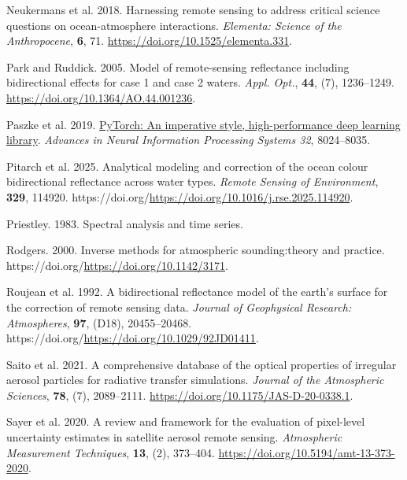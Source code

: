 \documentclass[
  11pt,
  letterpaper,
]{scrreprt}
\newlength{\cslhangindent}
\newenvironment{CSLReferences}[2] %
 {\begin{list}{}{%
  \setlength{\itemindent}{0pt}
  \setlength{\leftmargin}{0pt}
  \setlength{\parsep}{0pt}
  \ifodd #1
   \setlength{\leftmargin}{\cslhangindent}
   \setlength{\itemindent}{-1\cslhangindent}
  \fi
  \setlength{\itemsep}{#2\baselineskip}}}
 {\end{list}}
\begin{document}
\begin{CSLReferences}{1}{1}
Neukermans et al. 2018. Harnessing remote sensing to address critical
science questions on ocean-atmosphere interactions. \emph{Elementa:
Science of the Anthropocene}, \textbf{6}, 71.
\url{https://doi.org/10.1525/elementa.331}.

Park and Ruddick. 2005. Model of remote-sensing reflectance including
bidirectional effects for case 1 and case 2 waters. \emph{Appl. Opt.},
\textbf{44}, (7), 1236--1249.
\url{https://doi.org/10.1364/AO.44.001236}.

Paszke et al. 2019.
\href{http://papers.neurips.cc/paper/9015-pytorch-an-imperative-style-high-performance-deep-learning-library.pdf}{PyTorch:
An imperative style, high-performance deep learning library}.
\emph{Advances in Neural Information Processing Systems 32}, 8024--8035.

Pitarch et al. 2025. Analytical modeling and correction of the ocean
colour bidirectional reflectance across water types. \emph{Remote
Sensing of Environment}, \textbf{329}, 114920.
https://doi.org/\url{https://doi.org/10.1016/j.rse.2025.114920}.

Priestley. 1983. Spectral analysis and time series.

Rodgers. 2000. Inverse methods for atmospheric sounding:theory and
practice. https://doi.org/\url{https://doi.org/10.1142/3171}.

Roujean et al. 1992. A bidirectional reflectance model of the earth's
surface for the correction of remote sensing data. \emph{Journal of
Geophysical Research: Atmospheres}, \textbf{97}, (D18), 20455--20468.
https://doi.org/\url{https://doi.org/10.1029/92JD01411}.

Saito et al. 2021. A comprehensive database of the optical properties of
irregular aerosol particles for radiative transfer simulations.
\emph{Journal of the Atmospheric Sciences}, \textbf{78}, (7),
2089--2111. \url{https://doi.org/10.1175/JAS-D-20-0338.1}.

Sayer et al. 2020. A review and framework for the evaluation of
pixel-level uncertainty estimates in satellite aerosol remote sensing.
\emph{Atmospheric Measurement Techniques}, \textbf{13}, (2), 373--404.
\url{https://doi.org/10.5194/amt-13-373-2020}.


\end{CSLReferences}
\end{document}
